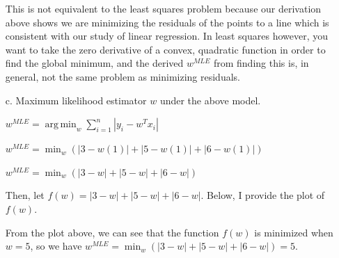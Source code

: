 \documentclass[12pt]{report}
\DeclareMathOperator*{\argmin}{arg\,min}
\begin{document}
\begin{enumerate}
  This is not equivalent to the least squares problem because our derivation
  above shows we are minimizing the residuals of the points to a line which is
  consistent with our study of linear regression. In least squares however, you
  want to take the zero derivative of a convex, quadratic function in order to
  find the global minimum, and the derived $w^{MLE}$ from finding this is, in
  general, not the same problem as minimizing residuals.

\item[c.] Maximum likelihood estimator $w$ under the above model.

  $w^{MLE}=\argmin_w\sum_{i=1}^{n}|y_i-w^Tx_i|$

  $w^{MLE}=\min_w(|3-w(1)|+|5-w(1)|+|6-w(1)|)$

  $w^{MLE}=\min_w(|3-w|+|5-w|+|6-w|)$

  Then, let $f(w) = |3-w|+|5-w|+|6-w|$. Below, I provide the plot of $f(w)$.

  \begin{figure}[H]
    \centering {}
  \end{figure}

  From the plot above, we can see that the function $f(w)$ is minimized when
  $w=5$, so we have $w^{MLE}=\min_w(|3-w|+|5-w|+|6-w|) = 5$.



\end{enumerate}
\end{document}

